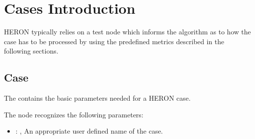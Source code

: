 \section{Cases Introduction}HERON typically relies on a test node which informs the algorithm as to how the case has to be processed by using the predefined metrics described in the following sections.






\subsection{Case}
  The  contains    the basic parameters needed for a HERON case.

  The  node recognizes the following parameters:
    \begin{itemize}
      \item {}: , 
        An appropriate user defined name of the case.
  \end{itemize}

